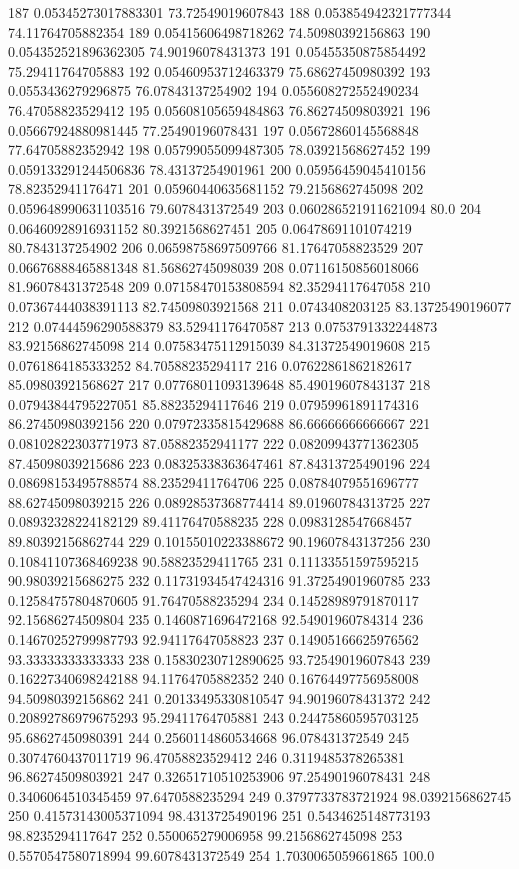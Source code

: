 {187 0.05345273017883301 73.72549019607843
188 0.053854942321777344 74.11764705882354
189 0.05415606498718262 74.50980392156863
190 0.054352521896362305 74.90196078431373
191 0.05455350875854492 75.29411764705883
192 0.05460953712463379 75.68627450980392
193 0.0553436279296875 76.07843137254902
194 0.055608272552490234 76.47058823529412
195 0.05608105659484863 76.86274509803921
196 0.05667924880981445 77.25490196078431
197 0.05672860145568848 77.64705882352942
198 0.05799055099487305 78.03921568627452
199 0.059133291244506836 78.43137254901961
200 0.05956459045410156 78.82352941176471
201 0.05960440635681152 79.2156862745098
202 0.059648990631103516 79.6078431372549
203 0.060286521911621094 80.0
204 0.06460928916931152 80.3921568627451
205 0.06478691101074219 80.7843137254902
206 0.06598758697509766 81.17647058823529
207 0.06676888465881348 81.56862745098039
208 0.07116150856018066 81.96078431372548
209 0.07158470153808594 82.35294117647058
210 0.07367444038391113 82.74509803921568
211 0.0743408203125 83.13725490196077
212 0.07444596290588379 83.52941176470587
213 0.0753791332244873 83.92156862745098
214 0.07583475112915039 84.31372549019608
215 0.0761864185333252 84.70588235294117
216 0.07622861862182617 85.09803921568627
217 0.07768011093139648 85.49019607843137
218 0.07943844795227051 85.88235294117646
219 0.07959961891174316 86.27450980392156
220 0.07972335815429688 86.66666666666667
221 0.08102822303771973 87.05882352941177
222 0.08209943771362305 87.45098039215686
223 0.08325338363647461 87.84313725490196
224 0.08698153495788574 88.23529411764706
225 0.08784079551696777 88.62745098039215
226 0.08928537368774414 89.01960784313725
227 0.08932328224182129 89.41176470588235
228 0.0983128547668457 89.80392156862744
229 0.10155010223388672 90.19607843137256
230 0.10841107368469238 90.58823529411765
231 0.11133551597595215 90.98039215686275
232 0.11731934547424316 91.37254901960785
233 0.12584757804870605 91.76470588235294
234 0.14528989791870117 92.15686274509804
235 0.1460871696472168 92.54901960784314
236 0.14670252799987793 92.94117647058823
237 0.14905166625976562 93.33333333333333
238 0.15830230712890625 93.72549019607843
239 0.16227340698242188 94.11764705882352
240 0.16764497756958008 94.50980392156862
241 0.20133495330810547 94.90196078431372
242 0.20892786979675293 95.29411764705881
243 0.24475860595703125 95.68627450980391
244 0.2560114860534668 96.078431372549
245 0.3074760437011719 96.47058823529412
246 0.3119485378265381 96.86274509803921
247 0.32651710510253906 97.25490196078431
248 0.3406064510345459 97.6470588235294
249 0.3797733783721924 98.0392156862745
250 0.41573143005371094 98.4313725490196
251 0.5434625148773193 98.8235294117647
252 0.550065279006958 99.2156862745098
253 0.5570547580718994 99.6078431372549
254 1.7030065059661865 100.0
}\tableexpivecdfrlactcrizosp
